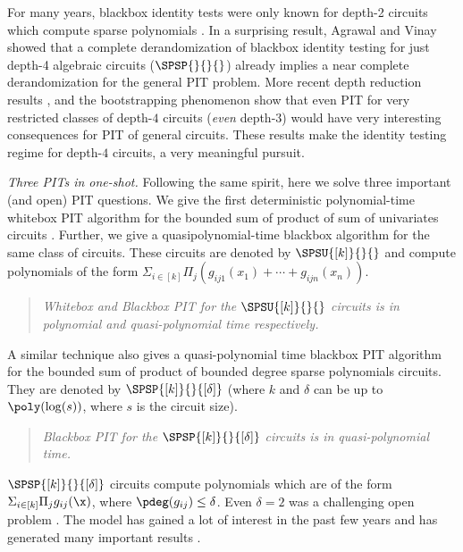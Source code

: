 For many years, blackbox identity tests were only known for depth-2 circuits which compute sparse polynomials \cite{ben1988deterministic,klivans2001randomness}. In a surprising result, Agrawal and Vinay \cite{agrawal2008arithmetic} showed that a complete derandomization of blackbox identity testing for just depth-4 algebraic circuits ($\SPSP{}{}{}$) already implies a near complete derandomization for the general PIT problem. More recent depth reduction results \cite{koiran2012arithmetic,gupta2013arithmetic}, and the bootstrapping phenomenon \cite{Agrawal8107,kumar2019near,DBLP:conf/focs/Guo0SS19,DBLP:conf/coco/000320} show that even PIT
for very restricted classes of depth-$4$  circuits (\emph{even} depth-$3$) would have very
interesting consequences for PIT of general circuits. These results make the identity testing regime for depth-$4$ circuits, a very meaningful pursuit.

\emph{Three PITs in one-shot.} Following the same spirit, here we solve three important (and open) PIT questions. We give the first deterministic polynomial-time whitebox PIT algorithm for the bounded sum of product of sum of univariates circuits \cite[Open Prob.~2]{saha2013case}. Further, we give a quasipolynomial-time blackbox algorithm for the same class of circuits. These circuits are denoted by $\SPSU{[k]}{}{}$ and compute polynomials of the form $\Sigma_{i \in [k]} \Pi_{j} \left(g_{ij1}(x_1)+ \cdots +g_{ijn}(x_n)\right)$.
\begin{quote}
    \itshape 
    Whitebox and Blackbox PIT for the $\SPSU{[k]}{}{}$ circuits is in polynomial and quasi-polynomial time respectively.
\end{quote}
%
A similar technique also gives a quasi-polynomial time blackbox PIT algorithm for the bounded sum of product of bounded degree sparse polynomials circuits. They are denoted by $\SPSP{[k]}{}{[\delta]}$ (where $k$ and $\delta$ can be up to \(\poly(\log(s))\), where \(s\) is the circuit size). 
\begin{quote}
    \itshape
    Blackbox PIT for the $\SPSP{[k]}{}{[\delta]}$ circuits is in quasi-polynomial time.
\end{quote}
%
$\SPSP{[k]}{}{[\delta]}$ circuits compute polynomials which are of the form $\Sigma_{i \in [k]} \Pi_{j} g_{ij}(\x)$, where $\pdeg(g_{ij}) \le \delta$. Even $\delta=2$ was a challenging open problem \cite[Open Problem~2]{DBLP:conf/coco/0001S16a}. The model has gained a lot of interest in the past few years and has generated many important results \cite{peleg2020generalized,peleg2020polynomial,GOS22,OS22}.

